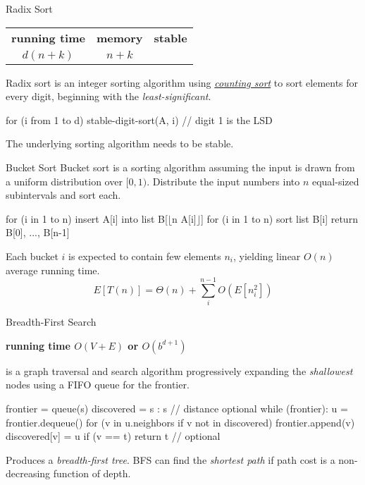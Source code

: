 \documentclass{cognito}
\begin{document}
\begin{note}{Radix Sort}
	\begin{mdframed}[linecolor=black!25!white]%
	\begin{tabular}{@{} c | c | c   @{}}
		\bf running time & \bf memory & \bf stable \\
		$d (n+k)$ & $n + k$ & \checkmark
	\end{tabular}%
	\end{mdframed}
	Radix sort is an integer sorting algorithm using \hyperref[note:Counting Sort]{\it counting sort}
	to sort elements for every digit, beginning with the \emph{least-significant}.
\begin{largecode}
for (i from 1 to d)
	stable-digit-sort(A, i) // digit 1 is the LSD
\end{largecode}
	\begin{remark} The underlying sorting algorithm needs to be stable.\end{remark}\vspace{-5pt}
\end{note}

\begin{note}{Bucket Sort}
	Bucket sort is a sorting algorithm assuming the input is drawn from a uniform distribution over $[0, 1)$.
	Distribute the input numbers into $n$ equal-sized subintervals and sort each.
	\begin{largecode}
 for (i in 1 to n) insert A[i] into list B[$\lfloor$n A[i]$\rfloor$]
 for (i in 1 to n) sort list B[i]
 return B[0], ..., B[n-1]
	\end{largecode}
	\begin{remark} Each bucket $i$ is expected to contain few elements $n_i$, yielding linear $O(n)$ average running time.
	$$ E\left[T(n)\right] = \Theta(n) + \sum_i^{n-1} O(E[n_i^2])$$
	\end{remark}\vspace{-10pt}
\end{note}


\begin{note}{Breadth-First Search}
	\begin{mdframed}[linecolor=black!25!white]
		\bf running time $O(V + E)$ or $O(b^{d+1})$
	\end{mdframed}
	 is a graph traversal and search algorithm progressively expanding the \emph{shallowest} nodes using a FIFO queue for the frontier.
	\begin{largecode}
 frontier = queue(s)
 discovered = {s : s}         // distance optional
 while (frontier):
 	u = frontier.dequeue()
	for (v in u.neighbors if v not in discovered)
		frontier.append(v)
		discovered[v] = u
		if (v == t) return t  // optional
	\end{largecode}%
	\begin{remark} Produces a \emph{breadth-first tree}.
	BFS can find the \emph{shortest path} if path cost is a non-decreasing function of depth. \end{remark}
	\vspace{-5pt}
\end{note}
\end{document}
